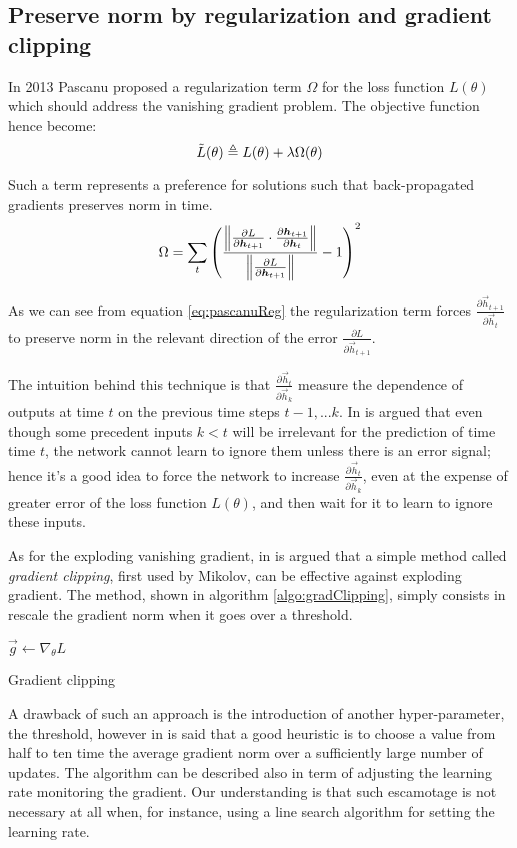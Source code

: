 \subsection{Preserve norm by regularization and gradient clipping} 

In 2013 Pascanu \cite{pascanu} proposed a regularization term $\Omega$ for the loss function $L(\theta)$ which should address the vanishing gradient problem.
The objective function hence become:
\begin{equation}
 \tilde{L}(\theta) \triangleq L(\theta) + \lambda\Omega(\theta)
\end{equation}

Such a term represents a preference for solutions such that back-propagated gradients preserves norm in time.
\begin{equation}
\Omega = \sum_t \left( \frac{\left\Vert  \frac{\partial L}{\partial \boldsymbol{h}_{t+1}} \cdot \frac{\partial \boldsymbol{h}_{t+1}}{\partial \boldsymbol{h}_t}  \right\Vert}{\left\Vert \frac{\partial L}{\partial \boldsymbol{h}_{t+1}} \right\Vert} -1  \right)^2 
\label{eq:pascanuReg}
\end{equation}

As we can see from equation \ref{eq:pascanuReg} the regularization term forces $\frac{\partial \vec{h}_{t+1}}{\partial \vec{h}_t}$ to preserve norm in the relevant direction of the error $\frac{\partial L}{\partial \vec{h}_{t+1}}$.

The intuition behind this technique is that $\frac{\partial \vec{h}_{t}}{\partial \vec{h}_k}$ measure the dependence of outputs at time $t$ on the previous time steps $t-1,...k$. In \cite{pascanu} is argued that even though some precedent inputs $k<t$ will be irrelevant for the prediction of time time $t$, the network cannot learn to ignore them unless there is an error signal; hence it's a good idea to force the network to increase $\frac{\partial \vec{h}_{t}}{\partial \vec{h}_k}$, even at the expense of greater error of the loss function $L(\theta)$, and then wait for it to learn to ignore these inputs.

As for the exploding vanishing gradient, in \cite{pascanu} is argued that a simple method called \textit{gradient clipping}, first used by Mikolov\cite{clippingMikolov}, can be effective against exploding gradient. The method, shown in algorithm \ref{algo:gradClipping}, simply consists in rescale the gradient norm when it goes over a threshold.

\begin{algorithm}[]
$\vec{g} \gets \nabla_{\theta} L$\\
\caption{Gradient clipping}
\label{algo:gradClipping}
\end{algorithm}

A drawback of such an approach is the introduction of another hyper-parameter, the threshold, however in \cite{pascanu} is said that a good heuristic
is to choose a value from half to ten time the average gradient norm over a sufficiently large number of updates.
The algorithm can be described also in term of adjusting the learning rate monitoring the gradient. Our understanding is that such escamotage is not necessary at all when, for instance, using a line search algorithm for setting the learning rate.